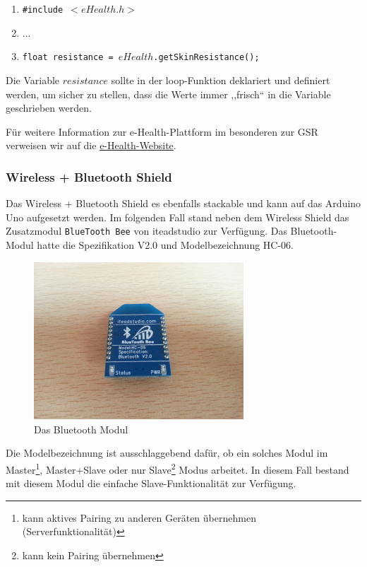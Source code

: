 \documentclass[10pt, a4paper, oneside, titlepage]{scrartcl} %
\begin{document}
	\begin{enumerate}
	 \item \texttt{\#include $ <eHealth.h> $}
	 \item ...
	 \item \texttt{float resistance = $eHealth$.getSkinResistance();}
	 \end{enumerate} 
	 
	 Die Variable $resistance$ sollte in der loop-Funktion deklariert und definiert werden, um sicher zu stellen, dass die Werte immer ,,frisch`` in die Variable geschrieben werden.
	 
	 Für weitere Information zur e-Health-Plattform im besonderen zur GSR verweisen wir auf die \href{http://www.cooking-hacks.com/documentation/tutorials/ehealth-biometric-sensor-platform-arduino-raspberry-pi-medical\#step4\_7}{e-Health-Website}.
	
	\subsubsection{Wireless + Bluetooth Shield}
	
	Das Wireless + Bluetooth Shield es ebenfalls stackable und kann auf das Arduino Uno aufgesetzt werden. 
	Im folgenden Fall stand neben dem Wireless Shield das Zusatzmodul \texttt{BlueTooth Bee} von iteadstudio zur Verfügung. Das Bluetooth-Modul hatte die Spezifikation V2.0 und Modelbezeichnung HC-06. 
	
		\begin{figure}[hbtp]
		\centering
		\includegraphics[width=0.7\textwidth]{implementierung_bluetooth-modul.jpg}
		\caption{Das Bluetooth Modul}
		\label{fig:Bluetooth-Modul}
		\end{figure}
		
	
	Die Modelbezeichnung ist ausschlaggebend dafür, ob ein solches Modul im Master\footnote{kann aktives Pairing zu anderen Geräten übernehmen (Serverfunktionalität)}, Master+Slave oder nur Slave\footnote{kann kein Pairing übernehmen} Modus arbeitet. In diesem Fall bestand mit diesem Modul die einfache Slave-Funktionalität zur Verfügung.
	
\end{document}
